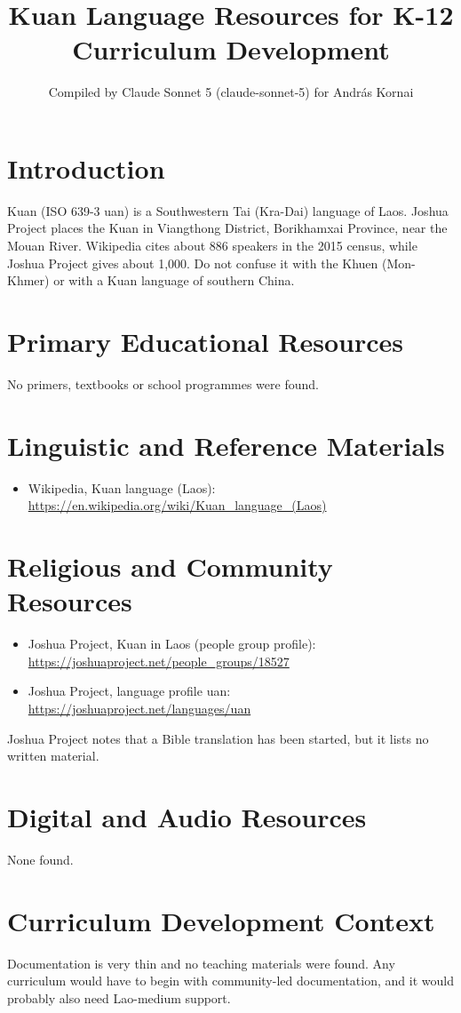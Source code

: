 \documentclass[12pt]{article}
\title{Kuan Language Resources for K-12 Curriculum Development}
\author{Compiled by Claude Sonnet 5 (claude-sonnet-5) for Andr\'as Kornai}
\date{}
\begin{document}
\maketitle
\section{Introduction}
Kuan (ISO 639-3 uan) is a Southwestern Tai (Kra-Dai) language of Laos. Joshua Project places the Kuan in Viangthong District, Borikhamxai Province, near the Mouan River. Wikipedia cites about 886 speakers in the 2015 census, while Joshua Project gives about 1,000. Do not confuse it with the Khuen (Mon-Khmer) or with a Kuan language of southern China.
\section{Primary Educational Resources}
No primers, textbooks or school programmes were found.
\section{Linguistic and Reference Materials}
\begin{itemize}
\item Wikipedia, Kuan language (Laos): \url{https://en.wikipedia.org/wiki/Kuan_language_(Laos)}
\end{itemize}
\section{Religious and Community Resources}
\begin{itemize}
\item Joshua Project, Kuan in Laos (people group profile): \url{https://joshuaproject.net/people_groups/18527}
\item Joshua Project, language profile uan: \url{https://joshuaproject.net/languages/uan}
\end{itemize}
Joshua Project notes that a Bible translation has been started, but it lists no written material.
\section{Digital and Audio Resources}
None found.
\section{Curriculum Development Context}
Documentation is very thin and no teaching materials were found. Any curriculum would have to begin with community-led documentation, and it would probably also need Lao-medium support.
\end{document}
